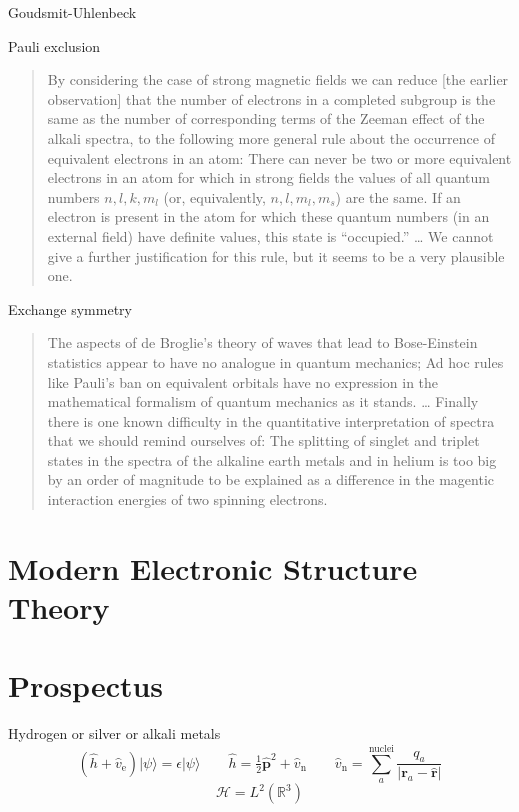 \noindent
Goudsmit-Uhlenbeck\cite{Uhlenbeck:1926p264}

\noindent
Pauli exclusion\cite{Pauli:1925p756}
\begin{quote}
    By considering the case of strong magnetic fields we can reduce
    [the earlier observation] that the number of electrons in a completed
    subgroup is the same as the number of corresponding terms of the Zeeman
    effect of the alkali spectra, to the following more general rule about the
    occurrence of equivalent electrons in an atom:
    There can never be two or more equivalent electrons in an atom for which in
    strong fields the values of all quantum numbers \(n, l, k, m_l\) (or,
    equivalently, \(n, l, m_l, m_s\)) are the same.
    If an electron is present in the atom for which these quantum numbers (in an
    external field) have definite values, this state is ``occupied.''
    \dots
    We cannot give a further justification for this rule, but it seems to be a
    very plausible one.
\end{quote}

\noindent
Exchange symmetry\cite{Heisenberg:1926p411}
\begin{quote}
    The aspects of de Broglie's theory of waves that lead to Bose-Einstein
    statistics\cite{Bose:1924p178,Einstein:1924p261,Einstein:1925p3} appear to
    have no analogue in quantum mechanics;
    Ad hoc rules like Pauli's ban on equivalent orbitals have no expression in
    the mathematical formalism of quantum mechanics as it stands.
    \dots
    Finally there is one known difficulty in the quantitative interpretation of
    spectra that we should remind ourselves of:
    The splitting of singlet and triplet states in the spectra of the alkaline
    earth metals and in helium is too big by an order of magnitude to be
    explained as a difference in the magentic interaction energies of two
    spinning electrons.
\end{quote}

\section{Modern Electronic Structure Theory}


\section{Prospectus}


Hydrogen or silver or alkali metals
\begin{equation}
    (\hat{h} + \hat{v}_\mathrm{e})
    |\psi\rangle
    =
    \epsilon
    |\psi\rangle
    \qquad
    \hat{h}
    =
    \tfrac{1}{2}
    \hat{\mathbf{p}}^2
    +
    \hat{v}_\mathrm{n}
    \qquad
    \hat{v}_\mathrm{n}
    =
    \sum_a^{\mathrm{nuclei}}
    \frac{q_a}{|\mathbf{r}_a-\hat{\mathbf{r}}|}
\end{equation}
\begin{equation}
    \mathcal{H}
    =
    L^2(\mathbb{R}^3)
\end{equation}

